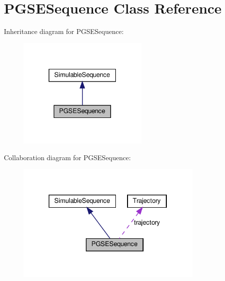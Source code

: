 \hypertarget{class_p_g_s_e_sequence}{}\section{P\+G\+S\+E\+Sequence Class Reference}
\label{class_p_g_s_e_sequence}


Inheritance diagram for P\+G\+S\+E\+Sequence\+:\nopagebreak
\begin{figure}[H]
\begin{center}
\leavevmode
\includegraphics[width=183pt]{class_p_g_s_e_sequence__inherit__graph}
\end{center}
\end{figure}


Collaboration diagram for P\+G\+S\+E\+Sequence\+:\nopagebreak
\begin{figure}[H]
\begin{center}
\leavevmode
\includegraphics[width=262pt]{class_p_g_s_e_sequence__coll__graph}
\end{center}
\end{figure}
